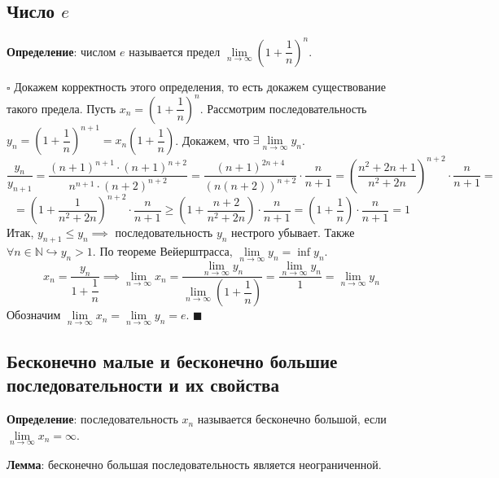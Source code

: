 \documentclass[12pt, a4paper, reqno]{article}
\begin{document}
\subsection{Число $e$}

    \textbf{Определение}: числом $e$ называется предел $\lim\limits_{n\to\infty}
    \left(1 + \dfrac{1}{n}\right)^n$.

    $\square$ Докажем корректность этого определения, то есть докажем существование такого предела.
    Пусть $x_n = \left(1 + \dfrac{1}{n}\right)^n$. Рассмотрим последовательность
    $y_n = \left(1 + \dfrac{1}{n}\right)^{n+1} = x_n\left(1 + \dfrac{1}{n}\right)$. Докажем, что
    $\exists\lim\limits_{n\to\infty} y_n$.
    \begin{equation*}
        \dfrac{y_n}{y_{n+1}} = \dfrac{(n+1)^{n+1}\cdot (n+1)^{n+2}}{n^{n+1}\cdot(n+2)^{n+2}} =
        \dfrac{(n+1)^{2n + 4}}{(n(n+2))^{n+2}}\cdot\dfrac{n}{n+1} =
        \left(\dfrac{n^2 + 2n + 1}{n^2 + 2n}\right)^{n + 2}\cdot\dfrac{n}{n+1} =
    \end{equation*}
    \begin{equation*}
        = \left(1 + \dfrac{1}{n^2 + 2n}\right)^{n+2}\cdot\dfrac{n}{n+1} \geq
        \left(1 + \dfrac{n+2}{n^2 + 2n}\right)\cdot\dfrac{n}{n+1} =
        \left(1 + \dfrac{1}{n}\right)\cdot\dfrac{n}{n+1} = 1
    \end{equation*}
    Итак, $y_{n+1} \leq y_n \implies$ последовательность $y_n$ нестрого убывает. Также
    $\forall n\in\mathbb{N} \hookrightarrow y_n > 1$. По теореме Вейерштрасса,
    $\lim\limits_{n\to\infty} y_n = \inf y_n$.
    \begin{equation*}
        x_n = \dfrac{y_n}{1 + \dfrac{1}{n}} \implies \lim\limits_{n\to\infty} x_n =
        \dfrac{\lim\limits_{n\to\infty} y_n}{\lim\limits_{n\to\infty} \left(1 + \dfrac{1}{n}\right)} =
        \dfrac{\lim\limits_{n\to\infty} y_n}{1} = \lim\limits_{n\to\infty} y_n
    \end{equation*}
    Обозначим $\lim\limits_{n\to\infty} x_n = \lim\limits_{n\to\infty} y_n = e$. $\blacksquare$

\subsection{Бесконечно малые и бесконечно большие последовательности и их свойства}

    \textbf{Определение}: последовательность $x_n$ называется бесконечно большой, если
    $\lim\limits_{n\to\infty} x_n = \infty$.

    \textbf{Лемма}: бесконечно большая последовательность является неограниченной.
\end{document}
